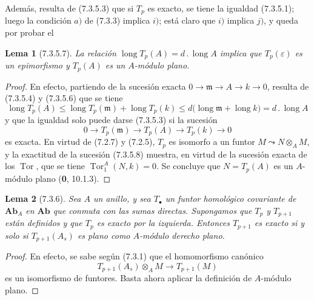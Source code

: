 \documentclass[10pt,oneside,openany]{book}
\theoremstyle{egaenv}\newtheorem*{env}{---}
\theoremstyle{egastatement}
\newtheorem*{lemma}{Lema}
\theoremstyle{egadescription}
\renewcommand{\leq}{\leqslant}
\begin{document}
Además, resulta de (7.3.5.3) que si $T_p$ es exacto, se tiene la igualdad
(7.3.5.1); luego la condición $a)$ de (7.3.3) implica $i)$; está claro que
$i)$ implica $j)$, y queda por probar el

\begin{lemma}[7.3.5.7]
La relación
$\operatorname{long}T_p(A)=d\mathbin{.}\operatorname{long}A$
implica que $T_p(\varepsilon)$ es un epimorfismo y $T_p(A)$ es un
$A$-módulo plano.
\end{lemma}

\begin{proof}
En efecto, partiendo de la sucesión exacta
$0\longrightarrow\mathfrak m\longrightarrow A\longrightarrow k\longrightarrow0$,
resulta de (7.3.5.4) y (7.3.5.6) que se tiene
\[
  \operatorname{long}T_p(A)
  \leq
  \operatorname{long}T_p(\mathfrak m)+\operatorname{long}T_p(k)
  \leq
  d\bigl(\operatorname{long}\mathfrak m+\operatorname{long}k\bigr)
  =d\mathbin{.}\operatorname{long}A
\]
y que la igualdad solo puede darse (7.3.5.3) si la sucesión
\[
  0\longrightarrow T_p(\mathfrak m)\longrightarrow T_p(A)
  \longrightarrow T_p(k)\longrightarrow0
  \tag{7.3.5.8}\label{III.7.3.5.8.fr}
\]
es exacta. En virtud de (7.2.7) y (7.2.5), $T_p$ es isomorfo a un funtor
$M\leadsto N\otimes_A M$, y la exactitud de la sucesión (7.3.5.8) muestra, en virtud
de la sucesión exacta de los $\operatorname{Tor}$, que se tiene
$\operatorname{Tor}_1^A(N,k)=0$. Se concluye que $N=T_p(A)$ es un
$A$-módulo plano (\textbf{0}, 10.1.3).
\end{proof}

\begin{lemma}[7.3.6]
\label{III.7.3.6}
Sea $A$ un anillo, y sea $T_\bullet$ un funtor homológico
covariante de $\boldsymbol{Ab}_A$ en $\boldsymbol{Ab}$ que conmuta con las
sumas directas. Supongamos que $T_p$ y $T_{p+1}$ están definidos y
que $T_p$ es exacto por la izquierda. Entonces $T_{p+1}$ es exacto
si y solo si $T_{p+1}(A_s)$ es plano como $A$-módulo derecho plano.
\end{lemma}

\begin{proof}
En efecto, se sabe según (7.3.1) que el homomorfismo canónico \[
  T_{p+1}(A_s)\otimes_A M\longrightarrow T_{p+1}(M)
\]
es un isomorfismo de funtores. Basta ahora aplicar la definición de
$A$-módulo plano.
\end{proof}
\end{document}
